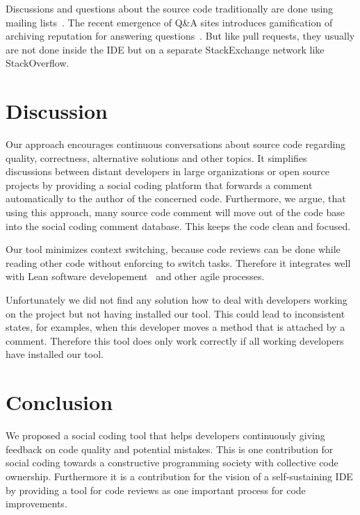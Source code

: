 \documentclass[10pt, conference]{IEEEtran}
\begin{document}
%
Discussions and questions about the source code traditionally are done using mailing lists~\cite{vasilescu2014QA}.
%
The recent emergence of Q\&A sites introduces gamification of archiving reputation for answering questions~\cite{vasilescu2014QA}.
%
But like pull requests, they usually are not done inside the IDE but on a separate StackExchange network like StackOverflow.

\section{Discussion}
Our approach encourages continuous conversations about source code regarding quality, correctness, alternative solutions and other topics. 
%
It simplifies discussions between distant developers in large organizations or open source projects by providing a social coding platform that forwards a comment automatically to the author of the concerned code.
%
Furthermore, we argue, that using this approach, many source code comment will move out of the code base into the social coding comment database. 
%
This keeps the code clean and focused.
%

%
Our tool minimizes context switching, because code reviews can be done while reading other code without enforcing to switch tasks. 
%
Therefore it integrates well with Lean software developement~\cite{poppendieck2003lean} and other agile processes. 
%

%
Unfortunately we did not find any solution how to deal with developers working on the project but not having installed our tool. 
%
This could lead to inconsistent states, for examples, when this developer moves a method that is attached by a comment. 
%
Therefore this tool does only work correctly if all working developers have installed our tool. 
\section{Conclusion}
We proposed a social coding tool that helps developers continuously giving feedback on code quality and potential mistakes.
%
This is one contribution for social coding towards a constructive programming society with collective code ownership. 
%
Furthermore it is a contribution for the vision of a self-sustaining IDE by providing a tool for code reviews as one important process for code improvements. 
\end{document}
